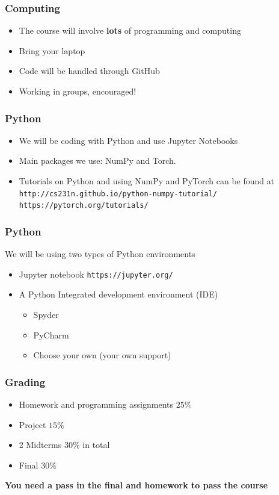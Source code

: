 \documentclass[12pt,fleqn]{beamer}
\begin{document}
\begin{frame}
\frametitle{Computing}

\begin{itemize}
\item The course will involve {\bf lots} of programming and computing
\item Bring your laptop
\item Code will be handled through GitHub
\item Working in groups, encouraged!
\end{itemize}

\end{frame}

\begin{frame}
\frametitle{Python}

\begin{itemize}
\item We will be coding with Python and use Jupyter Notebooks
\item Main packages we use: NumPy and Torch.
\item Tutorials on Python and using NumPy and PyTorch can be found at \\
{\tt http://cs231n.github.io/python-numpy-tutorial/} \\
{\tt https://pytorch.org/tutorials/}
\end{itemize}

\end{frame}

\begin{frame}
\frametitle{Python}

We will be using two types of Python environments
\begin{itemize}
\item Jupyter notebook {\tt https://jupyter.org/}
\item A Python Integrated development environment (IDE)
\begin{itemize}
\item Spyder
\item PyCharm
\item Choose your own (your own support)
\end{itemize}
\end{itemize}

\end{frame}


\begin{frame}
\frametitle{Grading}

\begin{itemize}
\item Homework and programming assignments $25\%$
\item Project $15\%$
\item 2 Midterms $30\%$ in total
\item Final $30\%$ 
\end{itemize}

{\bf You need a pass in the final and homework to pass the course}



\end{frame}
\end{document}
